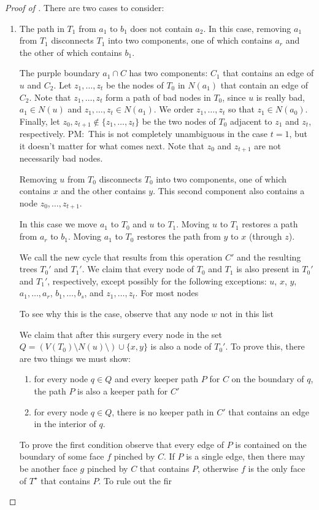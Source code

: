 \documentclass{patmorin}
\newcommand{\dual}[1]{{#1}^\star}
\newcommand{\note}[2]{{\color{red}#1:~#2}}
\begin{document}
\begin{proof}[Proof of ]
There are two cases to consider:

\begin{enumerate}
   \item The path in $T_1$ from $a_1$ to $b_1$ does not contain $a_2$.
     In this case, removing $a_1$ from $T_1$ disconnects $T_1$ into
     two components, one of which contains $a_r$ and the other of which
     contains $b_1$.  

     The purple boundary $a_1\cap C$ has two components: $C_1$ that
     contains an edge of $u$ and $C_2$.  Let $z_1,\ldots,z_t$ be the
     nodes of $T_0$ in $N(a_1)$ that contain an edge of $C_2$. Note
     that $z_1,\ldots,z_t$ form a path of bad nodes in $T_0$, since $u$
     is really bad, $a_1\in N(u)$ and $z_1,\ldots,z_t\in N(a_1)$. We
     order $z_1,\ldots,z_t$ so that $z_1\in N(a_0)$.  Finally, let
     $z_0,z_{t+1}\not\in\{z_1,\ldots,z_t\}$ be the two nodes of $T_0$
     adjacent to $z_1$ and $z_t$, respectively. \note{PM}{This is not
     completely unambiguous in the case $t=1$, but it doesn't matter for
     what comes next.}  Note that $z_0$ and $z_{t+1}$ are not necessarily
     bad nodes.

     Removing $u$ from $T_0$ disconnects $T_0$ into two components, one
     of which contains $x$ and the other contains $y$.  This second
     component also contains a node $z_0,\ldots,z_{t+1}$.

     In this case we move $a_1$ to $T_0$ and $u$ to $T_1$.  Moving $u$
     to $T_1$ restores a path from $a_r$ to $b_1$.  Moving $a_1$ to $T_0$
     restores the path from $y$ to $x$ (through $z$).

     We call the new cycle that results from this operation $C'$
     and the resulting trees $T_0'$ and $T_1'$.  We claim that every
     node of $T_0$ and $T_1$ is also present in $T_0'$ and $T_1'$,
     respectively, except possibly for the following exceptions: $u$,
     $x$, $y$, $a_1,\ldots,a_{r}$, $b_1,\ldots,b_{s}$, and $z_1,\ldots,z_t$.
     For most nodes


To see why this is the case, observe that any node $w$ not in this list

     We claim that after this surgery every node in the set $Q=(V(T_0)\setminus
     N(u)\setminus)\cup\{x,y\}$ is also a node of $T_0'$.  To prove this, there are two things we must show:
     \begin{enumerate} 
        \item for every node $q\in Q$ and every keeper path $P$ for $C$ on
        the boundary of $q$, the path $P$ is also a keeper path for $C'$
        \item for every node $q\in Q$, there is no keeper path in $C'$
        that contains an edge in the interior of $q$.
     \end{enumerate}
     To prove the first condition observe that every edge of $P$ is
     contained on the boundary of some face $f$ pinched by $C$.  If $P$
     is a single edge, then there may be another face $g$ pinched by $C$
     that contains $P$, otherwise $f$ is the only face of $\dual{T}$
     that contains $P$.  To rule out the fir



\end{enumerate}
\end{proof}
\end{document}
